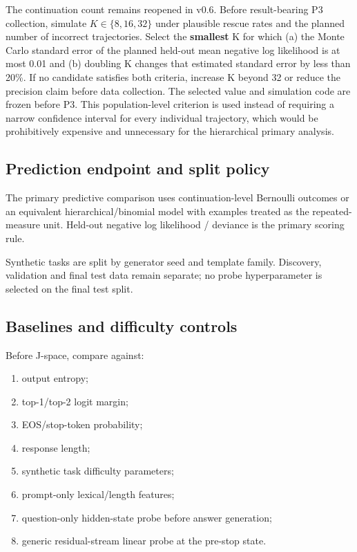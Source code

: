 The continuation count remains reopened in v0.6. Before result-bearing P3 collection, simulate \(K\in\{8,16,32\}\) under plausible rescue rates and the planned number of incorrect trajectories. Select the \textbf{smallest} K for which (a) the Monte Carlo standard error of the planned held-out mean negative log likelihood is at most 0.01 and (b) doubling K changes that estimated standard error by less than 20\%. If no candidate satisfies both criteria, increase K beyond 32 or reduce the precision claim before data collection. The selected value and simulation code are frozen before P3. This population-level criterion is used instead of requiring a narrow confidence interval for every individual trajectory, which would be prohibitively expensive and unnecessary for the hierarchical primary analysis.

\subsection{Prediction endpoint and split policy}\label{primary-prediction-endpoint}

The primary predictive comparison uses continuation-level Bernoulli outcomes or an equivalent hierarchical/binomial model with examples treated as the repeated-measure unit. Held-out negative log likelihood / deviance is the primary scoring rule.

Synthetic tasks are split by generator seed and template family. Discovery, validation and final test data remain separate; no probe hyperparameter is selected on the final test split.

\subsection{Baselines and difficulty controls}\label{baselines}

Before J-space, compare against:

\begin{enumerate}
\tightlist
\item output entropy;
\item top-1/top-2 logit margin;
\item EOS/stop-token probability;
\item response length;
\item synthetic task difficulty parameters;
\item prompt-only lexical/length features;
\item question-only hidden-state probe before answer generation;
\item generic residual-stream linear probe at the pre-stop state.
\end{enumerate}

